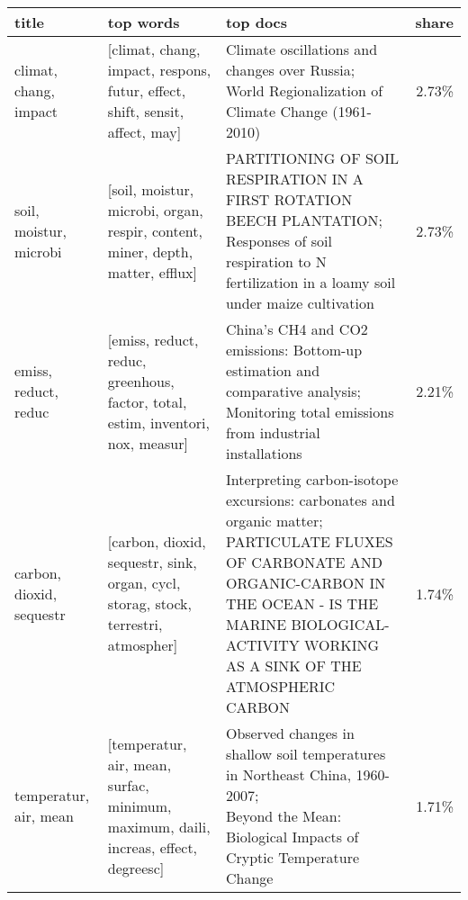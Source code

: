 \begin{tabular}{p{1.9cm} p{3cm} p{7.5cm} r}
\toprule
                      title &                                                                            top words &                                                                                                                                                                                                                                                                top docs &   share \\
\midrule
      climat, chang, impact &          [climat, chang, impact, respons, futur, effect, shift, sensit, affect, may] &                                                                                                                                                  \parbox[t]{7.5cm}{Climate oscillations and changes over Russia; \\World Regionalization of Climate Change (1961-2010)} &  2.73\% \\
     soil, moistur, microbi &       [soil, moistur, microbi, organ, respir, content, miner, depth, matter, efflux] &                                                                                    \parbox[t]{7.5cm}{PARTITIONING OF SOIL RESPIRATION IN A FIRST ROTATION BEECH PLANTATION; \\Responses of soil respiration to N fertilization in a loamy soil under maize cultivation} &  2.73\% \\
       emiss, reduct, reduc &      [emiss, reduct, reduc, greenhous, factor, total, estim, inventori, nox, measur] &                                                                                                             \parbox[t]{7.5cm}{China's CH4 and CO2 emissions: Bottom-up estimation and comparative analysis; \\Monitoring total emissions from industrial installations} &  2.21\% \\
   carbon, dioxid, sequestr &   [carbon, dioxid, sequestr, sink, organ, cycl, storag, stock, terrestri, atmospher] &                             \parbox[t]{7.5cm}{Interpreting carbon-isotope excursions: carbonates and organic matter; \\PARTICULATE FLUXES OF CARBONATE AND ORGANIC-CARBON IN THE OCEAN - IS THE MARINE BIOLOGICAL-ACTIVITY WORKING AS A SINK OF THE ATMOSPHERIC CARBON} &  1.74\% \\
      temperatur, air, mean &  [temperatur, air, mean, surfac, minimum, maximum, daili, increas, effect, degreesc] &                                                                                                     \parbox[t]{7.5cm}{Observed changes in shallow soil temperatures in Northeast China, 1960-2007; \\Beyond the Mean: Biological Impacts of Cryptic Temperature Change} &  1.71\% \\

\end{tabular}
